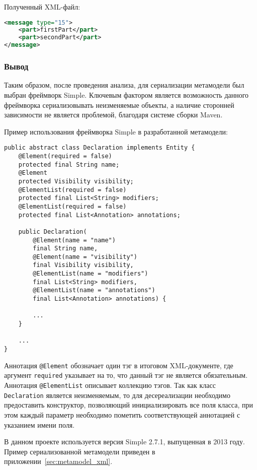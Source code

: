 Полученный XML-файл:

\begin{lstlisting}[language=xml, caption={Полученный XML-файл}]
<message type="15">
    <part>firstPart</part>
    <part>secondPart</part>
</message>
\end{lstlisting}

\subsubsection{Вывод}

Таким образом, после проведения анализа, для сериализации метамодели был выбран
фреймворк Simple. Ключевым фактором является возможность данного фреймворка
сериализовывать неизменяемые объекты, а наличие сторонней зависимости не
является проблемой, благодаря системе сборки Maven.

Пример использования фреймворка Simple в разработанной метамодели:

\begin{lstlisting}[caption={Пример использования фреймворка Simple в реализации метамодели}]
public abstract class Declaration implements Entity {
    @Element(required = false)
    protected final String name;
    @Element
    protected Visibility visibility;
    @ElementList(required = false)
    protected final List<String> modifiers;
    @ElementList(required = false)
    protected final List<Annotation> annotations;

    public Declaration(
        @Element(name = "name")
        final String name,
        @Element(name = "visibility")
        final Visibility visibility,
        @ElementList(name = "modifiers")
        final List<String> modifiers,
        @ElementList(name = "annotations")
        final List<Annotation> annotations) {

        ...
    }

    ...
}
\end{lstlisting}

Аннотация \texttt{@Element} обозначает один тэг в итоговом XML-документе, где
аргумент \texttt{required} указывает на то, что данный тэг не является
обязательным. Аннотация \texttt{@ElementList} описывает коллекцию тэгов. Так как
класс \texttt{Declaration} является неизменяемым, то для десереализации
необходимо предоставить конструктор, позволяющий инициализировать все поля
класса, при этом каждый параметр необходимо пометить соответствующей аннотацией
с указанием имени поля.

В данном проекте используется версия Simple 2.7.1, выпущенная в 2013 году.
Пример сериализованной метамодели приведен в приложении~\ref{sec:metamodel_xml}.

